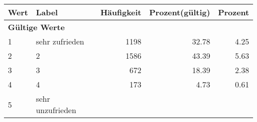      \begin{longtable}{lXrrr}
     \toprule
     \textbf{Wert} & \textbf{Label} & \textbf{Häufigkeit} & \textbf{Prozent(gültig)} & \textbf{Prozent} \\
     \endhead
     \midrule
     \multicolumn{5}{l}{\textbf{Gültige Werte}}\\

     1 &
     \multicolumn{1}{X}{ sehr zufrieden   } &


       \num{1198} &
       \num[round-mode=places,round-precision=2]{32,78} &
         \num[round-mode=places,round-precision=2]{4,25} \\

     2 &
     \multicolumn{1}{X}{ 2   } &


       \num{1586} &
       \num[round-mode=places,round-precision=2]{43,39} &
         \num[round-mode=places,round-precision=2]{5,63} \\

     3 &
     \multicolumn{1}{X}{ 3   } &


       \num{672} &
       \num[round-mode=places,round-precision=2]{18,39} &
         \num[round-mode=places,round-precision=2]{2,38} \\

     4 &
     \multicolumn{1}{X}{ 4   } &


       \num{173} &
       \num[round-mode=places,round-precision=2]{4,73} &
         \num[round-mode=places,round-precision=2]{0,61} \\

     5 &
     \multicolumn{1}{X}{ sehr unzufrieden   } &



\end{longtable}
